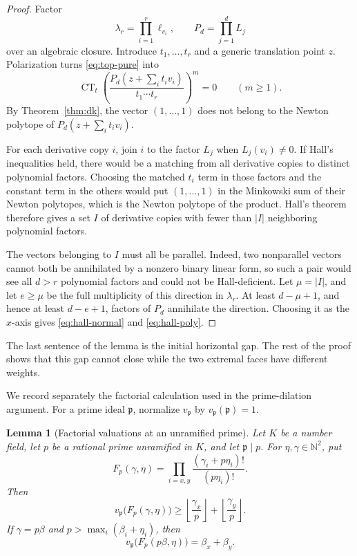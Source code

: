 \documentclass[11pt]{article}
\newtheorem{lemma}[theorem]{Lemma}
\newcommand{\N}{\mathbb N}
\newcommand{\CT}{\operatorname{CT}}
\begin{document}
\begin{proof}
Factor
\[
 \lambda_r=\prod_{i=1}^r \ell_{v_i},
 \qquad P_d=\prod_{j=1}^d L_j
\]
over an algebraic closure.  Introduce $t_1,\ldots,t_r$ and a generic
translation point $z$.  Polarization turns \eqref{eq:top-pure} into
\[
 \CT_t\left(
   \frac{P_d(z+\sum_i t_iv_i)}{t_1\cdots t_r}
          \right)^m=0
 \qquad(m\geq1).
\]
By Theorem~\ref{thm:dk}, the vector $(1,\ldots,1)$ does not belong to the
Newton polytope of $P_d(z+\sum_i t_iv_i)$.

For each derivative copy $i$, join $i$ to the factor $L_j$ when
$L_j(v_i)\ne0$.  If Hall's inequalities held, there would be a matching
from all derivative copies to distinct polynomial factors.  Choosing the
matched $t_i$ term in those factors and the constant term in the others
would put $(1,\ldots,1)$ in the Minkowski sum of their Newton polytopes,
which is the Newton polytope of the product.  Hall's theorem therefore gives
a set $I$ of derivative copies with fewer than $|I|$ neighboring polynomial
factors.

The vectors belonging to $I$ must all be parallel.  Indeed, two
nonparallel vectors cannot both be annihilated by a nonzero binary linear
form, so such a pair would see all $d>r$ polynomial factors and could not
be Hall-deficient.  Let $\mu=|I|$, and let $e\geq\mu$ be the full
multiplicity of this direction in $\lambda_r$.  At least $d-\mu+1$, and
hence at least $d-e+1$, factors of $P_d$ annihilate the direction.  Choosing
it as the $x$-axis gives \eqref{eq:hall-normal} and
\eqref{eq:hall-poly}.
\end{proof}

The last sentence of the lemma is the initial horizontal gap.  The rest of
the proof shows that this gap cannot close while the two extremal faces have
different weights.

We record separately the factorial calculation used in the prime-dilation
argument.  For a prime ideal $\mathfrak p$, normalize
$v_{\mathfrak p}$ by $v_{\mathfrak p}(\mathfrak p)=1$.

\begin{lemma}[Factorial valuations at an unramified prime]
\label{lem:factorial-valuations}
Let $K$ be a number field, let $p$ be a rational prime unramified in $K$,
and let $\mathfrak p\mid p$.  For $\eta,\gamma\in\N^2$, put
\[
 F_p(\gamma,\eta)=
 \prod_{i=x,y}\frac{(\gamma_i+p\eta_i)!}{(p\eta_i)!}.
\]
Then
\begin{equation}\label{eq:factorial-lower}
 v_{\mathfrak p}\bigl(F_p(\gamma,\eta)\bigr)
 \geq
 \left\lfloor\frac{\gamma_x}{p}\right\rfloor+
 \left\lfloor\frac{\gamma_y}{p}\right\rfloor.
\end{equation}
If $\gamma=p\beta$ and
$p>\max_i(\beta_i+\eta_i)$, then
\begin{equation}\label{eq:factorial-exact}
 v_{\mathfrak p}\bigl(F_p(p\beta,\eta)\bigr)
 =\beta_x+\beta_y.
\end{equation}
\end{lemma}
\end{document}
